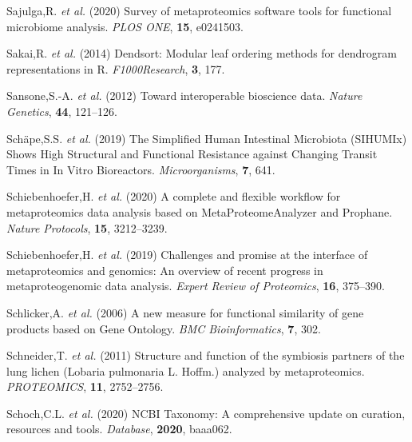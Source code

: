 \begin{CSLReferences}{1}{0}
\leavevmode\hypertarget{ref-sajulgaSurveyMetaproteomicsSoftware2020}{}%
Sajulga,R. \emph{et al.} (2020) Survey of metaproteomics software tools
for functional microbiome analysis. \emph{PLOS ONE}, \textbf{15},
e0241503.

\leavevmode\hypertarget{ref-sakaiDendsortModularLeaf2014}{}%
Sakai,R. \emph{et al.} (2014) Dendsort: Modular leaf ordering methods
for dendrogram representations in {R}. \emph{F1000Research}, \textbf{3},
177.

\leavevmode\hypertarget{ref-sansoneInteroperableBioscienceData2012}{}%
Sansone,S.-A. \emph{et al.} (2012) Toward interoperable bioscience data.
\emph{Nature Genetics}, \textbf{44}, 121--126.

\leavevmode\hypertarget{ref-schapeSimplifiedHumanIntestinal2019}{}%
Schäpe,S.S. \emph{et al.} (2019) The {Simplified Human Intestinal
Microbiota} ({SIHUMIx}) {Shows High Structural} and {Functional
Resistance} against {Changing Transit Times} in {In Vitro Bioreactors}.
\emph{Microorganisms}, \textbf{7}, 641.

\leavevmode\hypertarget{ref-schiebenhoeferCompleteFlexibleWorkflow2020}{}%
Schiebenhoefer,H. \emph{et al.} (2020) A complete and flexible workflow
for metaproteomics data analysis based on {MetaProteomeAnalyzer} and
{Prophane}. \emph{Nature Protocols}, \textbf{15}, 3212--3239.

\leavevmode\hypertarget{ref-schiebenhoeferChallengesPromiseInterface2019}{}%
Schiebenhoefer,H. \emph{et al.} (2019) Challenges and promise at the
interface of metaproteomics and genomics: An overview of recent progress
in metaproteogenomic data analysis. \emph{Expert Review of Proteomics},
\textbf{16}, 375--390.

\leavevmode\hypertarget{ref-schlickerNewMeasureFunctional2006}{}%
Schlicker,A. \emph{et al.} (2006) A new measure for functional
similarity of gene products based on {Gene Ontology}. \emph{BMC
Bioinformatics}, \textbf{7}, 302.

\leavevmode\hypertarget{ref-schneiderStructureFunctionSymbiosis2011}{}%
Schneider,T. \emph{et al.} (2011) Structure and function of the
symbiosis partners of the lung lichen ({Lobaria} pulmonaria {L}.
{Hoffm}.) analyzed by metaproteomics. \emph{PROTEOMICS}, \textbf{11},
2752--2756.

\leavevmode\hypertarget{ref-schochNCBITaxonomyComprehensive2020}{}%
Schoch,C.L. \emph{et al.} (2020) {NCBI Taxonomy}: A comprehensive update
on curation, resources and tools. \emph{Database}, \textbf{2020},
baaa062.


\end{CSLReferences}
